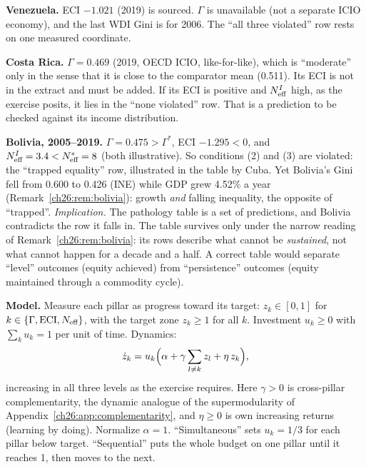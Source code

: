 \documentclass[../solutions_manual.tex]{subfiles}
\begin{document}
 \textbf{Venezuela.} ECI $-1.021$ (2019) is sourced. $\Gamma$ is unavailable (not a separate ICIO economy), and the last WDI Gini is for 2006. The ``all three violated'' row rests on one measured coordinate.

 \textbf{Costa Rica.} $\Gamma = 0.469$ (2019, OECD ICIO, like-for-like), which is ``moderate'' only in the sense that it is close to the comparator mean (0.511). Its ECI is not in the extract and must be added. If its ECI is positive and $N_{\text{eff}}^I$ high, as the exercise posits, it lies in the ``none violated'' row. That is a prediction to be checked against its income distribution.

 \textbf{Bolivia, 2005--2019.} $\Gamma = 0.475 > \Gamma^*$, ECI $-1.295 < 0$, and $N_{\text{eff}}^I = 3.4 < N^*_{\text{eff}} = 8$ (both illustrative). So conditions (2) and (3) are violated: the ``trapped equality'' row, illustrated in the table by Cuba. Yet Bolivia's Gini fell from 0.600 to 0.426 (INE) while GDP grew 4.52\% a year (Remark~\ref{ch26:rem:bolivia}): growth \emph{and} falling inequality, the opposite of ``trapped''. \emph{Implication.} The pathology table is a set of predictions, and Bolivia contradicts the row it falls in. The table survives only under the narrow reading of Remark~\ref{ch26:rem:bolivia}: its rows describe what cannot be \emph{sustained}, not what cannot happen for a decade and a half. A correct table would separate ``level'' outcomes (equity achieved) from ``persistence'' outcomes (equity maintained through a commodity cycle).


 \textbf{Model.} Measure each pillar as progress toward its target: $z_k \in [0,1]$ for $k \in \{\Gamma, \text{ECI}, N_{\text{eff}}\}$, with the target zone $z_k \ge 1$ for all $k$. Investment $u_k \ge 0$ with $\sum_k u_k = 1$ per unit of time. Dynamics:
\[
\dot z_k = u_k\Bigl(\alpha + \gamma\sum_{l\ne k} z_l + \eta\, z_k\Bigr),
\]
increasing in all three levels as the exercise requires. Here $\gamma > 0$ is cross-pillar complementarity, the dynamic analogue of the supermodularity of Appendix~\ref{ch26:app:complementarity}, and $\eta \ge 0$ is own increasing returns (learning by doing). Normalize $\alpha = 1$. ``Simultaneous'' sets $u_k = 1/3$ for each pillar below target. ``Sequential'' puts the whole budget on one pillar until it reaches 1, then moves to the next.
\end{document}
